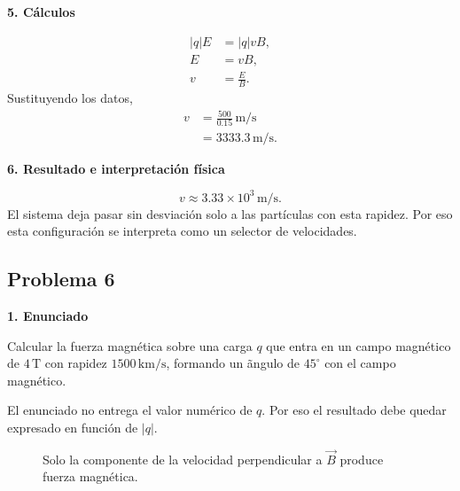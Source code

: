 \documentclass[11pt]{article}
\newcommand{\paso}[1]{%
  \par\medskip
  \noindent\textbf{#1}\par
  \vspace{0.1em}%
}
\newcommand{\Fsale}[2]{%
    \draw[redvec,very thick] (#1,#2) circle (0.16);
    \fill[redvec] (#1,#2) circle (0.04);
}
\begin{document}
\paso{5. C\'alculos}
\begin{align*}
    |q|E&=|q|vB,\\
    E&=vB,\\
    v&=\frac{E}{B}.
\end{align*}
Sustituyendo los datos,
\begin{align*}
    v&=\frac{500}{0.15}\,\mathrm{m/s}\\
     &=3333.3\,\mathrm{m/s}.
\end{align*}

\paso{6. Resultado e interpretaci\'on f\'isica}
\begin{equation*}
    \boxed{v\approx3.33\times10^3\,\mathrm{m/s}}.
\end{equation*}
El sistema deja pasar sin desviaci\'on solo a las part\'iculas con esta rapidez. Por eso esta configuraci\'on se interpreta como un selector de velocidades.

\newpage

\subsection*{Problema 6}
\paso{1. Enunciado}
Calcular la fuerza magn\'etica sobre una carga $q$ que entra en un campo magn\'etico de $4\,\mathrm T$ con rapidez $1500\,\mathrm{km/s}$, formando un \~angulo de $45^\circ$ con el campo magn\'etico.

\begin{alerta}
El enunciado no entrega el valor num\'erico de $q$. Por eso el resultado debe quedar expresado en funci\'on de $|q|$.
\end{alerta}

\begin{figure}[h!]
\centering
{}
\caption{Solo la componente de la velocidad perpendicular a $\vec B$ produce fuerza magn\'etica.}
\end{figure}
\end{document}
